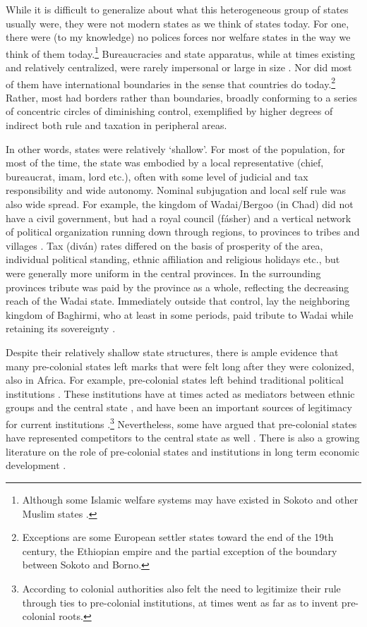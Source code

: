 \documentclass[12pt]{article}
\begin{document}
While it is difficult to generalize about what this heterogeneous group of
states usually were, they were not modern states as we think of states today.
For one, there were (to my knowledge) no polices forces nor welfare states in
the way we think of them today.\footnote{Although some Islamic welfare systems
may have existed in Sokoto \citep{Buba_2018} and other Muslim states
\citep{WeissHolger2002SwiM}.} Bureaucracies and state apparatus, while at times
existing and relatively centralized, were rarely impersonal or large in size
\citep{Herbst2014}. Nor did most of them have international boundaries in the
sense that countries do today.\footnote{Exceptions are some European settler
states toward the end of the 19th century, the Ethiopian empire and the partial
exception of the boundary between Sokoto and Borno.} Rather, most had borders
rather than boundaries, broadly conforming to a series of concentric circles of
diminishing control, exemplified by higher degrees of indirect both rule and
taxation in peripheral areas.

In other words, states were relatively `shallow'. For most of the
population, for most of the time, the state was embodied by a local
representative (chief, bureaucrat, imam, lord etc.), often with some level of
judicial and tax responsibility and wide autonomy. Nominal subjugation and local
self rule was also wide spread. For example, the kingdom of Wadai/Bergoo (in
Chad) did not have a civil government, but had a royal council (fásher) and a
vertical network of political organization running down through regions, to
provinces to tribes and villages \citep{barth1857travels}. Tax (diván) rates
differed on the basis of prosperity of the area, individual political standing,
ethnic affiliation and religious holidays etc., but were generally more uniform
in the central provinces. In the surrounding provinces tribute was paid by the
province as a whole, reflecting the decreasing reach of the Wadai state.
Immediately outside that control, lay the neighboring kingdom of Baghirmi, who
at least in some periods, paid tribute to Wadai while retaining its sovereignty
\citep{barth1857travels}.

Despite their relatively shallow state structures, there is ample evidence that
many pre-colonial states left marks that were felt long after they were
colonized, also in Africa. For example, pre-colonial states left behind
traditional political institutions \citep{Beall_2005, Holzinger_2016,
Holzinger_2020, Neupert_Wentz_2021, Ubink_2008}. These institutions have at
times acted as mediators between ethnic groups and the central state
\citep{boone2014property, Englebert2002}, and have been an important sources of
legitimacy for current institutions \citep{Wig2016}.\footnote{According to
	\citet{mamdani2018citizen} colonial authorities also felt the need to
	legitimize their rule through ties to pre-colonial institutions, at
times went as far as to invent pre-colonial roots.} Nevertheless, some have
argued that pre-colonial states have represented competitors to the central
state as well \citep{Herbst2014}. There is also a growing literature on the role
of pre-colonial states and institutions in long term economic development
\citep{Michalopoulos2018, Acemoglu2014, Gennaioli2007, Bockstette2002,
Wilfahrt_2021}.
\end{document}
